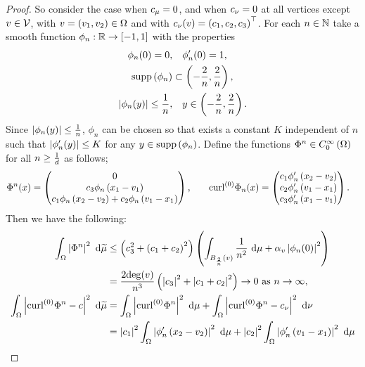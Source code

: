 \begin{proof}
	So consider the case when $c_{\mu}=0$, and when $c_{\nu}=0$ at all vertices except $v\in\mathcal{V}$, with $v=\left( v_1, v_2 \right)\in\Omega$ and with $c_{\nu}(v) = \left( c_1, c_2, c_3 \right)^\top$.
	For each $n\in\mathbb{N}$ take a smooth function $\phi_n:\mathbb{R}\rightarrow\left[ -1,1 \right]$ with the properties
	\begin{align*}
		\phi_n(0) = 0,
		&\quad	\phi'_n(0) = 1, \\
		\mathrm{supp}\left( \phi_n \right) &\subset\left( -\frac{2}{n},\frac{2}{n} \right), \\
		\left\lvert \phi_n(y) \right\rvert \leq \frac{1}{n}, &\quad y\in \left( -\frac{2}{n},\frac{2}{n} \right).
	\end{align*}
	Since $\left\lvert \phi_n(y) \right\rvert \leq \frac{1}{n}$, $\phi_n$ can be chosen so that exists a constant $K$ independent of $n$ such that $\left\lvert \phi_n'(y) \right\rvert \leq K$ for any $y\in\mathrm{supp}\left( \phi_n \right)$.
	Define the functions $\Phi^n\in C^{\infty}_{0}\left( \Omega \right)$ for all $n\geq\frac{1}{d}$ as follows;
	\begin{align*}
		\Phi^n(x) = 
		\begin{pmatrix} 
			0 \\ 
			c_3\phi_n\left( x_1 - v_1 \right) \\ 
			c_1\phi_n\left( x_2-v_2 \right) + c_2\phi_n\left( v_1-x_1 \right) 
		\end{pmatrix},
		&\qquad
		\mathrm{curl}_{}^{(0)}\Phi_n(x) =
		\begin{pmatrix}
			c_1\phi'_n\left( x_2-v_2 \right) \\
			c_2\phi'_n\left( v_1-x_1 \right) \\
			c_3\phi'_n\left( x_1-v_1 \right)
		\end{pmatrix}.
	\end{align*}
	Then we have the following:
	\begin{align*}
		\integral{\ddom}{ \abs{ \Phi^n }^2 }{\dddmes}
		&\leq \bracs{c_3^2 + \bracs{c_1 + c_2}^2} \bracs{ \integral{B_{\frac{2}{n}}(v)}{ \recip{n^2} }{\ddmes}
		+ \alpha_v\abs{\phi_n(0)}^2 } \\
		&= \frac{2\mathrm{deg}(v)}{n^3}\bracs{\abs{c_3}^2 + \abs{c_1 + c_2}^2} \rightarrow 0 \toInfty{n}, \\
		\integral{\ddom}{ \abs{ \ocurl{}\Phi^n - c }^2 }{\dddmes}
		&= \integral{\ddom}{ \abs{ \ocurl{}\Phi^n}^2 }{\ddmes}
		+ \integral{\ddom}{ \abs{ \ocurl{}\Phi^n - c_{\massMes} }^2 }{\massMes} \\
		&= \abs{c_1}^2\integral{\ddom}{ \abs{\phi'_n\bracs{x_2-v_2}}^2 }{\ddmes}
		+ \abs{c_2}^2\integral{\ddom}{ \abs{\phi'_n\bracs{v_1-x_1}}^2 }{\ddmes} \\

\end{align*}
\end{proof}
